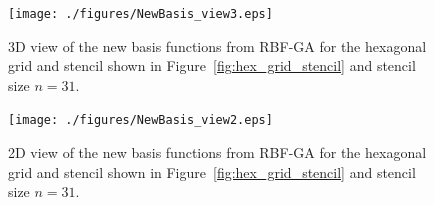 \documentclass[11pt]{report}
\begin{document}
\begin{figure}
\centering
{\textwidth
\texttt{[image: ./figures/NewBasis\_view3.eps]}}
\caption{3D view of the new basis functions from RBF-GA for the hexagonal grid and stencil shown in Figure~\ref{fig:hex_grid_stencil} and stencil size $n=31$.}
\label{fig:psis_3d}
\end{figure}

\begin{figure}
\centering
{\textwidth
\texttt{[image: ./figures/NewBasis\_view2.eps]}}
\caption{2D view of the new basis functions from RBF-GA for the hexagonal grid and stencil shown in Figure~\ref{fig:hex_grid_stencil} and stencil size $n=31$.}
\label{fig:psis_2d}
\end{figure}


\ifstandalone


\end{document}
